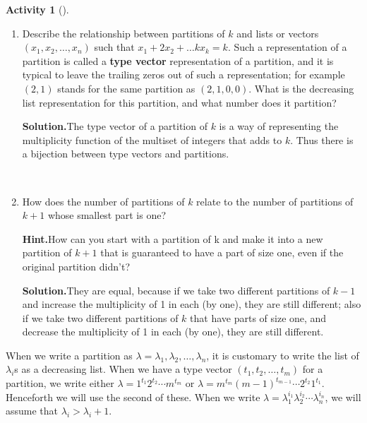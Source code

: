 \documentclass[10pt,]{book}
\newcommand{\terminology}[1]{\textbf{#1}}
\theoremstyle{plain}
\theoremstyle{definition}
\newtheorem{activity}[project]{Activity}
\numberwithin{equation}{chapter}
\begin{document}
\begin{activity}[]\label{activity-150}
~\par
\begin{enumerate}[label=(\alph*)]
 \item Describe the relationship between partitions of \(k\) and lists or vectors \((x_1,x_2,\ldots,x_n)\) such that \(x_1+2x_2+\ldots kx_k = k\).  Such a representation of a partition is called a \terminology{type vector} representation of a partition, and it is typical to leave the trailing zeros out of such a representation; for example \((2,1)\) stands for the same partition as \((2,1,0,0)\). What is the decreasing list representation for this partition, and what number does it partition?%
\par\medskip\noindent%
\textbf{Solution.}\quad The type vector of a partition of \(k\) is a way of representing the multiplicity function of the multiset of integers that adds to \(k\). Thus there is a bijection between type vectors and partitions.%

~\par
\item How does the number of partitions of \(k\) relate to the number of partitions of \(k+1\) whose smallest part is one?%
\par\medskip\noindent%
\textbf{Hint.}\quad How can you start with a partition of k and make it into a new partition of \(k+1\) that is guaranteed to have a part of size one, even if the original partition didn’t?%
\par\medskip\noindent%
\textbf{Solution.}\quad They are equal, because if we take two different partitions of \(k-1\) and increase the multiplicity of 1 in each (by one), they are still different; also if we take two different partitions of \(k\) that have parts of size one, and decrease the multiplicity of 1 in each (by one), they are still different.%

\end{enumerate}
\end{activity}
When we write a partition as \(\lambda = \lambda_1,\lambda_2,\ldots,\lambda_n\), it is customary to write the list of \(\lambda_i\)s as a decreasing list. When we have a type vector \((t_1,t_2,\ldots,t_m)\) for a partition, we write either \(\lambda = 1^{t_1}2^{t_2}\cdots m^{t_m}\) or \(\lambda = m^{t_m}(m-1)^{t_{m-1}}\cdots 2^{t_2}1^{t_1}\). Henceforth we will use the second of these. When we write \(\lambda=\lambda_1^{i_1}\lambda_2^{i_2}\cdots\lambda_n^{i_n}\), we will assume that \(\lambda_i>\lambda_i+1\).%
\typeout{************************************************}
\typeout{************************************************}
\end{document}

